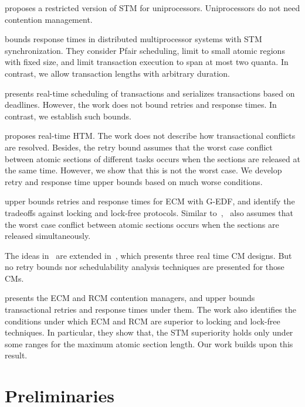 \documentclass[conference]{IEEEtran}
\begin{document}
\cite{manson2006preemptible} proposes a restricted version of STM for uniprocessors. Uniprocessors do not need contention management.

\cite{fahmy2009bounding} bounds response times in distributed multiprocessor systems with STM synchronization. They consider Pfair scheduling, limit to small atomic regions with fixed size, and limit transaction execution to span at most two quanta. In contrast, we allow transaction lengths 
with  arbitrary duration. 

\cite{sarni2009real} presents real-time scheduling of transactions and serializes transactions based on deadlines. However, the work does not bound retries and response times. In contrast, we establish such bounds.


\cite{schoeberl2010rttm} proposes real-time HTM. The work does not describe how transactional conflicts are resolved. Besides, the retry bound assumes that the worst case conflict between atomic sections of different tasks occurs when the sections are released at the same time. However, we show that this is not the worst case. We develop retry and response time upper bounds based on much worse conditions.


\cite{key-1} upper bounds retries and response times for  ECM with G-EDF, and identify the tradeoffs against locking and lock-free protocols. Similar to~\cite{schoeberl2010rttm},~\cite{key-1} also assumes that the worst case conflict between atomic sections occurs when the sections are released simultaneously. 

The ideas in~\cite{key-1} are extended in~\cite{barrosmanaging}, which presents three real time CM designs. But no retry bounds nor schedulability analysis techniques are presented for those CMs. 

\cite{stmconcurrencycontrol:emsoft11} presents the ECM and RCM contention managers, and upper bounds transactional retries and response times under them. The work also identifies the conditions under which ECM and RCM are superior to locking and lock-free techniques. In particular, they show that, the STM superiority holds only under some ranges for the maximum atomic section length. Our work builds upon this result.

\section{Preliminaries}
\label{sec:model}
\end{document}

